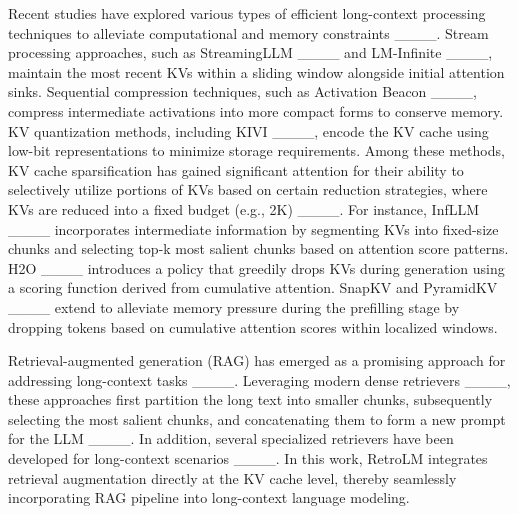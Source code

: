 Recent studies have explored various types of efficient long-context processing techniques to alleviate computational and memory constraints ____.
Stream processing approaches, such as StreamingLLM ____ and LM-Infinite ____, maintain the most recent KVs within a sliding window alongside initial attention sinks. Sequential compression techniques, such as Activation Beacon ____, compress intermediate activations into more compact forms to conserve memory. KV quantization methods, including KIVI ____, encode the KV cache using low-bit representations to minimize storage requirements. 
Among these methods, KV cache sparsification has gained significant attention for their ability to selectively utilize portions of KVs based on certain reduction strategies, where KVs are reduced into a fixed budget (e.g., 2K) ____. For instance, InfLLM ____ incorporates intermediate information by segmenting KVs into fixed-size chunks and selecting top-k most salient chunks based on attention score patterns. H2O ____ introduces a policy that greedily drops KVs during generation using a scoring function derived from cumulative attention. SnapKV and PyramidKV ____ extend to alleviate memory pressure during the prefilling stage by dropping tokens based on cumulative attention scores within localized windows. 

Retrieval-augmented generation (RAG) has emerged as a promising approach for addressing long-context tasks ____. Leveraging modern dense retrievers ____, these approaches first partition the long text into smaller chunks, subsequently selecting the most salient chunks, and concatenating them to form a new prompt for the LLM ____. In addition, several specialized retrievers have been developed for long-context scenarios ____. In this work, RetroLM integrates retrieval augmentation directly at the KV cache level, thereby seamlessly incorporating RAG pipeline into long-context language modeling.